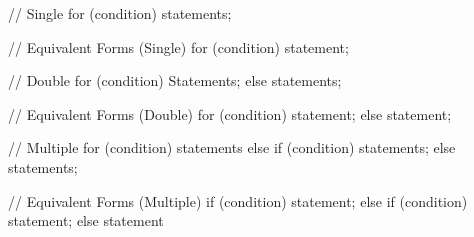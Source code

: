 \documentclass{report}
\begin{document}
    \begin{cppcode}

    // Single
    for (condition){
        statements;
    }

    // Equivalent Forms (Single)
    for (condition)
        statement;

    // Double
    for (condition){
        Statements;
    }else {
        statements;
    }

    // Equivalent Forms (Double)
    for (condition)
        statement;
    else 
        statement;

    // Multiple
    for (condition){
        statements
    }else if (condition){
        statements;
    }else {
       statements; 
    }

    // Equivalent Forms (Multiple)
    if (condition)
        statement;
    else if (condition)
        statement;
    else 
        statement

    \end{cppcode}
    

    \bigbreak \noindent 

    \pagebreak
\end{document}

